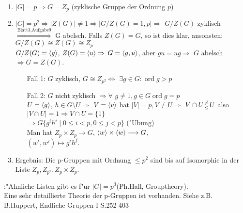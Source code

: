 \begin{enumerate}
\item $|G|=p \Rightarrow G=Z_p$ (zyklische Gruppe der Ordnung $p$)
\item $|G|=p^2 \Rightarrow |Z(G)|\neq 1 \Rightarrow |G/Z(G)=1,p|
      \Rightarrow$ $G/Z(G)$ zyklisch 
	  $\stackrel{\operatorname{Blatt 3,Aufgabe 9}}{\Rightarrow} $ G abelsch. 
	  Falls $Z(G)=G$, so ist dies klar, ansonsten:
	  $G/Z(G)\cong Z(G)\cong Z_p$ \\
	  $G/Z(G)={\left\langle g\right\rangle}$, $Z(G)={\left\langle u\right\rangle} \Rightarrow$
	  $G={\left\langle g,u\right\rangle}$, aber $gu=ug \Rightarrow$ $G$ abelsch
	  $\Rightarrow G=Z(G)$.
  \begin{enumerate}
	 \item[Fall 1:] $G$ zyklisch, $G\cong Z_{p^2}\Leftrightarrow$
	  $\exists g\in G:\operatorname{ord}g>p$
	 \item[Fall 2:] $G$ nicht zyklisch $\Rightarrow \forall$
	  $g\neq 1, g\in G \operatorname{ord}g=p$ \\
	  $U={\left\langle g\right\rangle}$, $h\in G\setminus U \Rightarrow$
	  $V={\left\langle v\right\rangle}$ hat $|V|=p, V\neq U \Rightarrow$
	  $V\cap U \stack(\neq;\leq) U$ also
	  $|V\cap U|=1 \Rightarrow V\cap U =\{1\}$\\
	  $\Rightarrow G\{g^ih^i\mid 0\leq i <p,0\leq j<p\}$ ("Ubung)\\
	  Man hat $Z_p\times Z_p \longrightarrow G$,
	  ${\left\langle w\right\rangle}\times {\left\langle w\right\rangle}\longrightarrow G$,\\
	  $(w^i,w^j)\mapsto g^ih^j$. 
  \end{enumerate}
 \item Ergebnis: Die p-Gruppen mit Ordnung $\leq p^2$ sind bis auf
       Isomorphie in der Liste $Z_p,Z_{p^2},Z_p\times Z_p$.
\end{enumerate}		
\remark{}:{"Ahnliche Listen gibt es f"ur
       $|G|=p^3$(Ph.Hall, Grouptheory).\\
	   Eine sehr detaillierte Theorie der p-Gruppen ist vorhanden.
	   Siehe z.B. B.Huppert, Endliche Gruppen I S.252-403}
   
